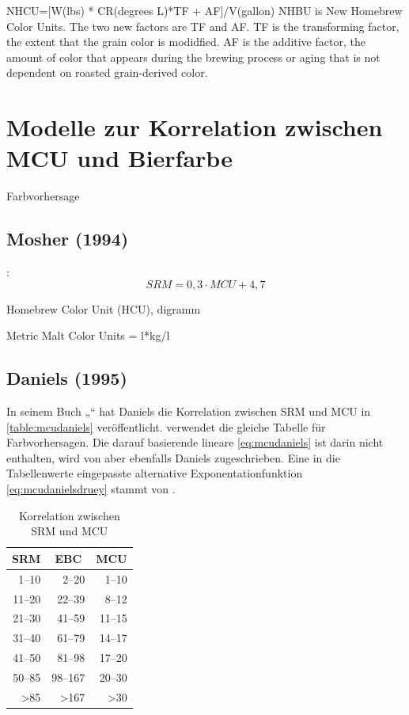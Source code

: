 \documentclass[a4paper,parskip=half]{scrartcl}
\newcommand{\MCU}{\mathit{MCU}}
\newcommand{\SRM}{\mathit{SRM}}
\begin{document}
NHCU=[W(lbs) * CR(degrees L)*TF + AF]/V(gallon)
NHBU is New Homebrew Color Units. The two new factors are TF and AF. TF is the transforming factor, the
extent that the grain color is modidfied. AF is the additive factor, the amount of color that appears during the
brewing process or aging that is not dependent on roasted grain-derived color.

\section*{Modelle zur Korrelation zwischen MCU und Bierfarbe}

Farbvorhersage

\subsection*{Mosher (1994)}

\parencite{Morey}:
\begin{equation}
\SRM = 0,3 \cdot \MCU + 4,7
\label{eq:mcumosher}
\end{equation}

Homebrew Color Unit (HCU), digramm
\parencite[34]{Mosher1994}

Metric Malt Color Units = l*kg/l
\parencite[258]{Mosher2015}

\subsection*{Daniels (1995)}

In seinem Buch „“ hat Daniels die Korrelation zwischen SRM und MCU in \autoref{table:mcudaniels} veröffentlicht. \textcite[10]{Holle2010} verwendet die gleiche Tabelle für Farbvorhersagen. Die darauf basierende lineare \autoref{eq:mcudaniels} ist darin nicht enthalten, wird von \textcite{Morey} aber ebenfalls Daniels zugeschrieben. Eine in die Tabellenwerte eingepasste alternative Exponentationfunktion \autoref{eq:mcudanielsdruey} stammt von \textcite{Druey1998}.

\begin{table}[H]
\centering
\begin{tabular}{rrr}
\toprule
\multicolumn{1}{c}{\textbf{SRM}} & \multicolumn{1}{c}{\textbf{EBC}} & \multicolumn{1}{c}{\textbf{MCU}} \\
\midrule
1–10 & 2–20 & 1–10 \\
11–20 & 22–39 & 8–12 \\
21–30 & 41–59 & 11–15 \\
31–40 & 61–79 & 14–17 \\
41–50 & 81–98 & 17–20 \\
50–85 & 98–167 & 20–30 \\
>85 & >167 & >30 \\
\bottomrule
\end{tabular}
\caption{Korrelation zwischen SRM und MCU \parencite[61]{Daniels1996}}
\label{table:mcudaniels}
\end{table}
\end{document}
